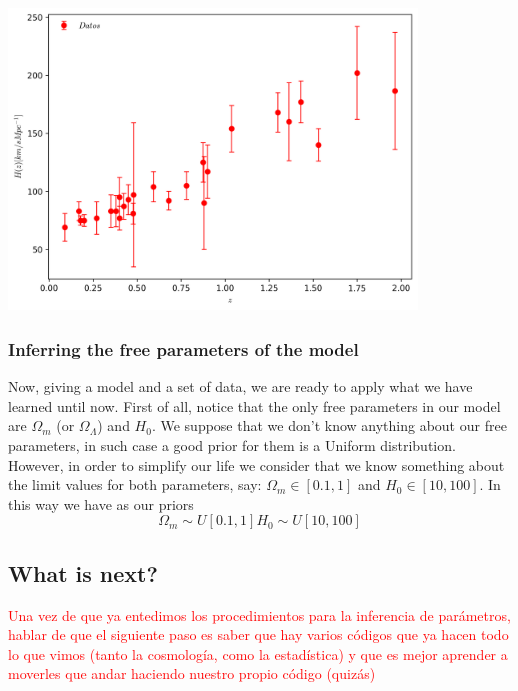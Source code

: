 \documentclass[onecolumn,           %
               showpacs,            %
               preprintnumbers,     %
               aps,                 %
               prl,          	    %
               letterpaper,             %
               superscriptaddress,      %
               nofootinbib,         %
               tightenlines,        %
               floats,floatfix      %
               ,usenatbib,
               ]{revtex4-1}
\begin{document}
\begin{minipage}{\textwidth}
\centering
\includegraphics[height=8cm]{Hzdata.png}
\label{HzData}
\end{minipage}

\subsubsection{Inferring the free parameters of the model}

Now, giving a model and a set of data, we are ready to apply what we have learned until now. First of all, notice that the only free parameters in our model are $\Omega_m$ (or $\Omega_\Lambda$) and $H_0$. We suppose that we don't know anything about our free parameters, in such case a good prior for them is a Uniform distribution. However, in order to simplify our life we consider that we know something about the limit values for both parameters,  say: $\Omega_m\in [0.1,1]$ and $H_0\in [10,100]$. In this way we have as our priors
\begin{subequations}
\begin{equation}
\Omega_m\sim U[0.1,1]
\end{equation}
\begin{equation}
H_0\sim U[10,100]
\end{equation}
\end{subequations} 
\subsection{What is next?}

\textcolor{red}{Una vez de que ya entedimos los procedimientos para la inferencia de par\'ametros, hablar de que el siguiente paso es saber que hay varios c\'odigos que ya hacen todo lo que vimos (tanto la cosmolog\'ia, como la estad\'istica) y que es mejor aprender a moverles que andar haciendo nuestro propio código (quiz\'as)}
\end{document}

